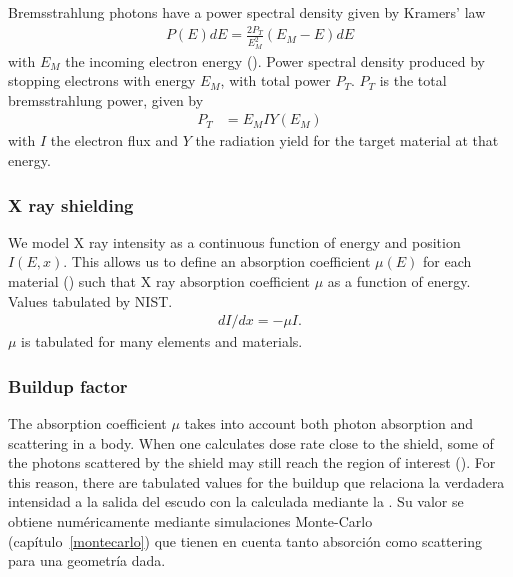 Bremsstrahlung photons have a power spectral density given by
Kramers' law\cite{kramers_xciii._1923}
\begin{align}
    P(E)dE = \frac{2P_T}{E_M^2}(E_M-E)dE
    \label{eq:kramers}
\end{align} with $E_M$ the incoming electron energy ().
{Power spectral density produced by stopping electrons with energy $E_M$,
with total power $P_T$.}
$P_T$ is the total bremsstrahlung power, given by
\begin{align*}
    P_T&=E_MIY(E_M)
\end{align*} with $I$ the electron flux
and $Y$ the radiation yield for the target material at that energy.
\subsubsection{X ray shielding}
We model X ray intensity as a continuous function of energy and position $I(E,x)$.
This allows us to define an absorption coefficient $\mu(E)$ for each material
() such that
{X ray absorption coefficient $\mu$ as a function of energy.
    Values tabulated by NIST\cite{xraycoef}.}
\begin{align}
    \label{eq:absorcionx}
    dI/dx=-\mu I.
\end{align}
$\mu$ is tabulated for many elements and materials\cite{xraycoef}.
\subsubsection{Buildup factor}
The absorption coefficient $\mu$ takes into account both photon absorption and scattering in a body.
When one calculates dose rate close to the shield,
some of the photons scattered by the shield may still reach the region of interest
().
For this reason, there are tabulated values for the buildup 
que relaciona la verdadera intensidad a la salida del escudo 
con la calculada mediante la .
Su valor se obtiene numéricamente mediante simulaciones Monte-Carlo
(capítulo~\ref{montecarlo})
que tienen en cuenta tanto absorción como scattering
para una geometría dada.

